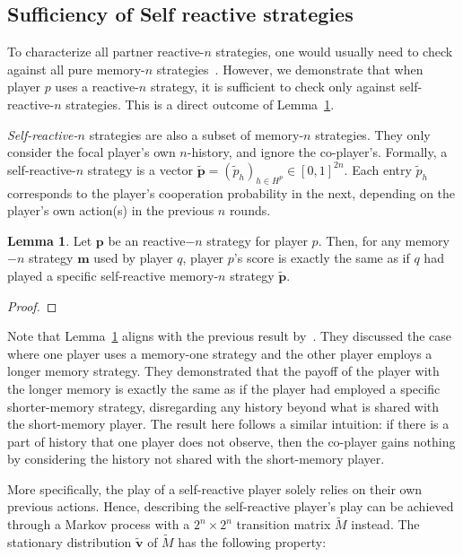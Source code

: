 \documentclass{article}
\theoremstyle{definition}
\newtheorem{lemma}[theorem]{Lemma}
\begin{document}
\subsection{Sufficiency of Self reactive strategies}\label{section:self_reactive_sufficiency}

To characterize all partner reactive-$n$ strategies, one would usually need
to check against all pure memory-$n$ strategies~\cite{mcavoy:PRSA:2019}.
However, we demonstrate that when player $p$ uses a reactive-$n$
strategy, it is sufficient to check only against self-reactive-$n$
strategies. This is a direct outcome of Lemma~\ref{lemma:self_reactive_sufficiency}.

{\it Self-reactive-$n$} strategies are also a subset of memory-$n$ strategies.
They only consider the focal player's own $n$-history, and ignore the co-player's.
Formally, a self-reactive-$n$ strategy is a vector
$\mathbf{\tilde{p}} = (\tilde{p}_h)_{h \in H^p} \in [0, 1] ^ {2n}$. Each entry
$\tilde{p}_h$ corresponds to the player's cooperation probability in the next,
depending on the player's own action(s) in the previous $n$ rounds.

\begin{lemma}\label{lemma:self_reactive_sufficiency}
  Let $\mathbf{p}$ be an reactive$-n$ strategy for player $p$. Then, for any
  memory$-n$ strategy $\mathbf{m}$ used by player $q$, player $p$'s score is
  exactly the same as if $q$ had played a specific self-reactive memory-$n$
  strategy $\mathbf{\tilde{p}}$.
\end{lemma}

\begin{proof}
\end{proof}

Note that Lemma~\ref{lemma:self_reactive_sufficiency} aligns with the previous
result by~\cite{press:PNAS:2012}. They discussed the case where one player uses
a memory-one strategy and the other player employs a longer memory strategy.
They demonstrated that the payoff of the player with the longer memory is
exactly the same as if the player had employed a specific shorter-memory
strategy, disregarding any history beyond what is shared with the short-memory
player. The result here follows a similar intuition: if there is a part of
history that one player does not observe, then the co-player gains nothing by
considering the history not shared with the short-memory player.

More specifically, the play of a self-reactive player solely relies on their own
previous actions. Hence, describing the self-reactive player's play can be
achieved through a Markov process with a $2^{n}\!\times\!2^{n}$ transition
matrix $\tilde{M}$ instead. The stationary distribution $\mathbf{\tilde{v}}$ of
$\tilde{M}$ has the following property:
\end{document}
